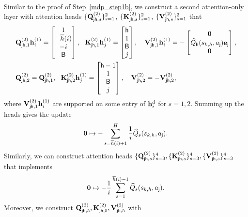 Similar to the proof of Step~\ref{mdp_step1b}, we construct a second attention-only layer with attention heads   $\{{\mathbf Q}_{{\mathsf{j}}{\mathsf{h}},s}^{(2)}\}^2_{s=1}$, $\{{\mathbf K}_{{\mathsf{j}}{\mathsf{h}},s}^{(2)}\}^2_{s=1}$, $\{{\mathbf V}_{{\mathsf{j}}{\mathsf{h}},s}^{(2)}\}^2_{s=1}$ that
\begin{align*}
  & {\mathbf Q}_{{\mathsf{j}}{\mathsf{h}},1}^{(2)}{\mathbf h}_i^{(1)} =\begin{bmatrix}
       1\\-\overline{h}(i)\\-i\\
       {\mathsf{B}}
   \end{bmatrix},~~ {\mathbf K}_{{\mathsf{j}}{\mathsf{h}},1}^{(2)}{\mathbf h}_j^{(1)} =\begin{bmatrix}
   {\mathsf{h}}\\ 1 \\{\mathsf{B}}\\ j
   \end{bmatrix},~~~
   {\mathbf V}_{{\mathsf{j}}{\mathsf{h}},1}^{(2)}{\mathbf h}_i^{(1)} =-\begin{bmatrix}
       {\mathbf 0} \\  {\widehat{{Q}}}_{\mathsf{h}}({s}_{k,h},{a}_{\mathsf{j}}){\mathbf e}_{{\mathsf{j}}}\\
       {\mathbf 0}
   \end{bmatrix},
   \\
   & {\mathbf Q}_{{\mathsf{j}}{\mathsf{h}},2}^{(2)}={\mathbf Q}_{{\mathsf{j}}{\mathsf{h}},1}^{(2)},~~ {\mathbf K}_{{\mathsf{j}}{\mathsf{h}},2}^{(2)}{\mathbf h}_j^{(1)} =\begin{bmatrix}
   {\mathsf{h}}-1\\ 1 \\{\mathsf{B}}\\ j
   \end{bmatrix},~~~
   {\mathbf V}_{{\mathsf{j}}{\mathsf{h}},2}^{(2)} =-  {\mathbf V}_{{\mathsf{j}}{\mathsf{h}},2}^{(2)},
\end{align*} where $ {\mathbf V}_{{\mathsf{j}}{\mathsf{h}},1}^{(2)}{\mathbf h}_i^{(1)}$ are supported on some entry of ${\mathbf h}_i^{d}$ for $s=1,2$.
Summing up the heads gives the update
\begin{align*}
    {\mathbf 0}\mapsto -\sum_{s=\overline{h}(i)+1}^{{H}}\frac{1}{i}{\widehat{{Q}}}_{s}({s}_{k,h},{a}_{\mathsf{j}}).
\end{align*}
Similarly, we can construct attention heads   $\{{\mathbf Q}_{{\mathsf{j}}{\mathsf{h}},s}^{(2)}\}^4_{s=3},\{{\mathbf K}_{{\mathsf{j}}{\mathsf{h}},s}^{(2)}\}^4_{s=3},\{{\mathbf V}_{{\mathsf{j}}{\mathsf{h}},s}^{(2)}\}^4_{s=3}$ that implements
\begin{align*}
    {\mathbf 0}\mapsto -\frac{1}{i}\sum_{s=1}^{\overline{h}(i)-1}{{\widehat{{Q}}}_{s}({s}_{k,h},{a}_{\mathsf{j}})}.
\end{align*}
Moreover, we construct
${\mathbf Q}_{{\mathsf{j}}{\mathsf{h}},5}^{(2)},{\mathbf K}_{{\mathsf{j}}{\mathsf{h}},5}^{(2)},{\mathbf V}_{{\mathsf{j}}{\mathsf{h}},5}^{(2)}$ with
